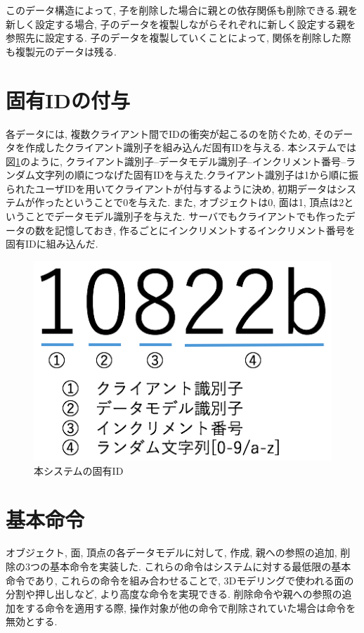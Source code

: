 このデータ構造によって, 子を削除した場合に親との依存関係も削除できる.親を新しく設定する場合, 子のデータを複製しながらそれぞれに新しく設定する親を参照先に設定する.
子のデータを複製していくことによって, 関係を削除した際も複製元のデータは残る.
\section{固有IDの付与} \label{固有id}
各データには, 複数クライアント間でIDの衝突が起こるのを防ぐため, そのデータを作成したクライアント識別子を組み込んだ固有IDを与える.
本システムでは図\ref{uuid}のように, クライアント識別子--データモデル識別子--インクリメント番号--ランダム文字列の順につなげた固有IDを与えた.クライアント識別子は1から順に振られたユーザIDを用いてクライアントが付与するように決め, 初期データはシステムが作ったということで0を与えた. また, オブジェクトは0, 面は1, 頂点は2ということでデータモデル識別子を与えた. サーバでもクライアントでも作ったデータの数を記憶しておき, 作るごとにインクリメントするインクリメント番号を固有IDに組み込んだ.
\begin{figure}[htbp]
  \begin{center}
    \includegraphics[scale=0.4]{images/uuid}
    \caption{本システムの固有ID}
    \label{uuid}
  \end{center}
\end{figure}
\section{基本命令} \label{ope}
オブジェクト, 面, 頂点の各データモデルに対して, 作成, 親への参照の追加, 削除の3つの基本命令を実装した.
これらの命令はシステムに対する最低限の基本命令であり, これらの命令を組み合わせることで, 3Dモデリングで使われる面の分割や押し出しなど, より高度な命令を実現できる.
削除命令や親への参照の追加をする命令を適用する際, 操作対象が他の命令で削除されていた場合は命令を無効とする.
